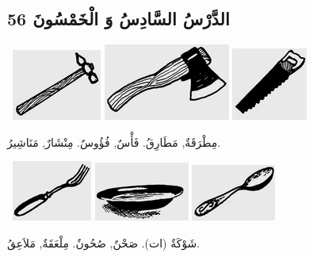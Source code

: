 \documentclass[a5paper]{article}
\begin{document}
\subsection{الدَّرْسُ السَّادِسُ وَ الْخَمْسُونَ 56}
\  \includegraphics[width=1.1563in,height=0.9165in]{MuhammadBagauddinlatinized-img179.png}   \includegraphics[width=1.6354in,height=0.9898in]{MuhammadBagauddinlatinized-img180.png}   \includegraphics[width=0.9791in,height=0.9374in]{MuhammadBagauddinlatinized-img181.png} 

مِطْرَقَةٌ, مَطَارِقُ. فَأْسٌ, فُؤُوسٌ. مِنْشَارٌ, مَنَاشِيرُ. 

\  \includegraphics[width=1.0311in,height=0.7811in]{MuhammadBagauddinlatinized-img182.png}   \includegraphics[width=1.2291in,height=0.7602in]{MuhammadBagauddinlatinized-img183.png}   \includegraphics[width=1.0937in,height=0.7291in]{MuhammadBagauddinlatinized-img184.png} 

شَوْكَةٌ (ات). صَحْنٌ, صُحُونٌ. مِلْعَقَةٌ, مَلاَعِقُ. 
\end{document}
